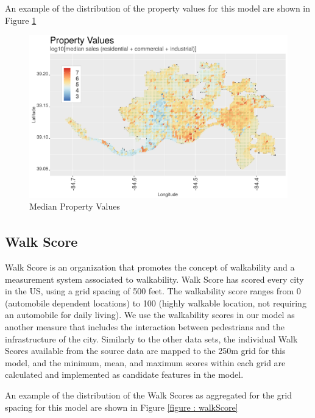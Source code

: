 \documentclass{llncs}
\begin{document}
An example of the distribution of the property values for this model are shown in Figure \ref{figure : medianpropertyvalues}

\FloatBarrier
\begin{figure}
 	\includegraphics[width=\textwidth, height=\textheight, keepaspectratio]{propertyValuesMedianAllY}
 	\caption{Median Property Values}
	\label{figure : medianpropertyvalues}
\end{figure}
\FloatBarrier


\subsection{Walk Score\textsuperscript{\tiny\textregistered}}

Walk Score is an organization that promotes the concept of walkability and a measurement system associated to walkability. Walk Score has scored every city in the US, using a grid spacing of 500 feet. The walkability score ranges from 0 (automobile dependent locations) to 100 (highly walkable location, not requiring an automobile for daily living). We use the walkability scores in our model as another measure that includes the interaction between pedestrians and the infrastructure of the city. Similarly to the other data sets, the individual Walk Scores available from the source data are mapped to the 250m grid for this model, and the minimum, mean, and maximum scores within each grid are calculated and implemented as candidate features in the model.

An example of the distribution of the Walk Scores as aggregated for the grid spacing for this model are shown in Figure \ref{figure : walkScore}
\end{document}
